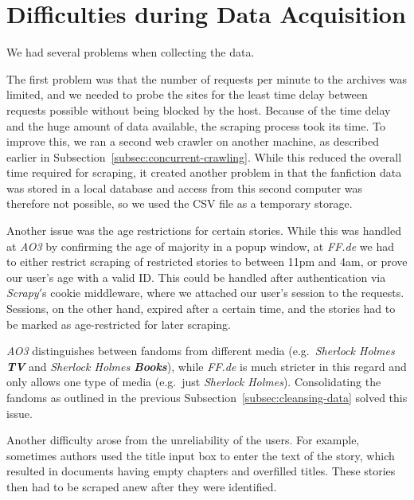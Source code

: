 \section{Difficulties during Data Acquisition}\label{sec:difficulties-acquisition}
We had several problems when collecting the data.

The first problem was that the number of requests per minute to the archives was limited, and we needed to probe the sites for the least time delay between requests possible without being blocked by the host.
Because of the time delay and the huge amount of data available, the scraping process took its time.
To improve this, we ran a second web crawler on another machine, as described earlier in Subsection~\ref{subsec:concurrent-crawling}.
While this reduced the overall time required for scraping, it created another problem in that the fanfiction data was stored in a local database and access from this second computer was therefore not possible, so we used the CSV file as a temporary storage.

Another issue was the age restrictions for certain stories.
While this was handled at \emph{AO3} by confirming the age of majority in a popup window, at \emph{FF.de} we had to either restrict scraping of restricted stories to between 11pm and 4am, or prove our user's age with a valid ID\@.
This could be handled after authentication via \emph{Scrapy}$'$s cookie middleware, where we attached our user's session to the requests.
Sessions, on the other hand, expired after a certain time, and the stories had to be marked as age-restricted for later scraping.

\emph{AO3} distinguishes between fandoms from different media (e.g.~\emph{Sherlock Holmes \textbf{TV}} and \emph{Sherlock Holmes \textbf{Books}}), while \emph{FF.de} is much stricter in this regard and only allows one type of media (e.g.~just \emph{Sherlock Holmes}).
Consolidating the fandoms as outlined in the previous Subsection~\ref{subsec:cleansing-data} solved this issue.

Another difficulty arose from the unreliability of the users.
For example, sometimes authors used the title input box to enter the text of the story, which resulted in documents having empty chapters and overfilled titles.
These stories then had to be scraped anew after they were identified.

